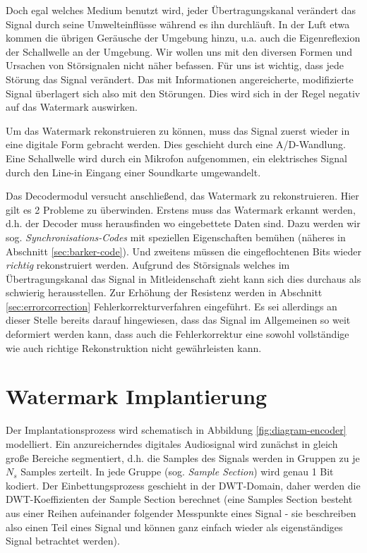 Doch egal welches Medium benutzt wird, jeder Übertragungskanal verändert das Signal durch seine Umwelteinflüsse während es ihn durchläuft. In der Luft etwa kommen die übrigen Geräusche der Umgebung hinzu, u.a. auch die Eigenreflexion der Schallwelle an der Umgebung. 
Wir wollen uns mit den diversen Formen und Ursachen von Störsignalen nicht näher befassen. Für uns ist wichtig, dass jede Störung das Signal verändert. Das mit Informationen angereicherte, modifizierte Signal überlagert sich also mit den Störungen. Dies wird sich in der Regel negativ auf das Watermark auswirken. 

Um das Watermark rekonstruieren zu können, muss das Signal zuerst wieder in eine digitale Form gebracht werden. Dies geschieht durch eine A/D-Wandlung. Eine Schallwelle wird durch ein Mikrofon aufgenommen, ein elektrisches Signal durch den Line-in Eingang einer Soundkarte umgewandelt. 

Das Decodermodul versucht anschließend, das Watermark zu rekonstruieren. Hier gilt es 2 Probleme zu überwinden. Erstens muss das Watermark erkannt werden, d.h. der Decoder muss herausfinden wo eingebettete Daten sind. Dazu werden wir sog. \textit{Synchronisations-Codes} mit speziellen Eigenschaften bemühen (näheres in Abschnitt \ref{sec:barker-code}). Und zweitens müssen die eingeflochtenen Bits wieder \textit{richtig} rekonstruiert werden. Aufgrund des Störsignals welches im Übertragungskanal das Signal in Mitleidenschaft zieht kann sich dies durchaus als schwierig herausstellen. Zur Erhöhung der Resistenz werden in Abschnitt \ref{sec:errorcorrection} Fehlerkorrekturverfahren eingeführt. Es sei allerdings an dieser Stelle bereits darauf hingewiesen, dass das Signal im Allgemeinen so weit deformiert werden kann, dass auch die Fehlerkorrektur eine sowohl vollständige wie auch richtige Rekonstruktion nicht gewährleisten kann. 

\section{Watermark Implantierung}
\label{sec:embedding}

Der Implantationsprozess wird schematisch in Abbildung \ref{fig:diagram-encoder} modelliert. Ein anzureicherndes digitales Audiosignal wird zunächst in gleich große Bereiche segmentiert, d.h. die Samples des Signals werden in Gruppen zu je $N_s$ Samples zerteilt. In jede Gruppe (sog. \textit{Sample Section}) wird genau 1 Bit kodiert. Der Einbettungsprozess geschieht in der DWT-Domain, daher werden die DWT-Koeffizienten  der Sample Section berechnet (eine Samples Section besteht aus einer Reihen aufeinander folgender Messpunkte eines Signal - sie beschreiben also einen Teil eines Signal und können ganz einfach wieder als eigenständiges Signal betrachtet werden). 

